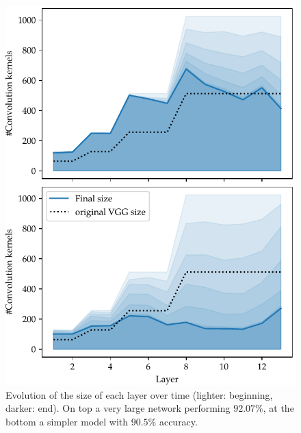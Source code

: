 \begin{figure}[t]
\begin{center}
\includegraphics[width=\columnwidth]{size_evolution}
\vspace*{-5mm} \caption{\label{network_size_evolution} Evolution of the size of
  each layer over time (lighter: beginning, darker: end). On top a very large
  network performing $92.07\%$, at the bottom a simpler model with $90.5\%$
  accuracy. 
} \end{center}
\vspace*{-4mm}
\end{figure}

